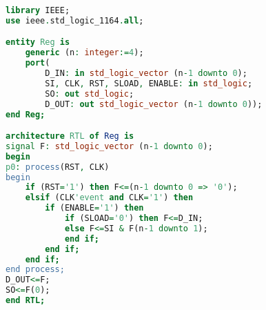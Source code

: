 


\lstset{style=mystyle}
 
 
 
 
\begin{lstlisting}[language=VHDL, caption= Register VHDL Code]
library IEEE;
use ieee.std_logic_1164.all;

entity Reg is
	generic (n: integer:=4);
	port(
		D_IN: in std_logic_vector (n-1 downto 0);
		SI, CLK, RST, SLOAD, ENABLE: in std_logic;
		SO: out std_logic;
		D_OUT: out std_logic_vector (n-1 downto 0));
end Reg;

architecture RTL of Reg is
signal F: std_logic_vector (n-1 downto 0);
begin
p0: process(RST, CLK)
begin
	if (RST='1') then F<=(n-1 downto 0 => '0');
	elsif (CLK'event and CLK='1') then
		if (ENABLE='1') then
			if (SLOAD='0') then F<=D_IN;
			else F<=SI & F(n-1 downto 1);
			end if;
		end if;
	end if;
end process;
D_OUT<=F;
SO<=F(0);
end RTL;
\end{lstlisting}
